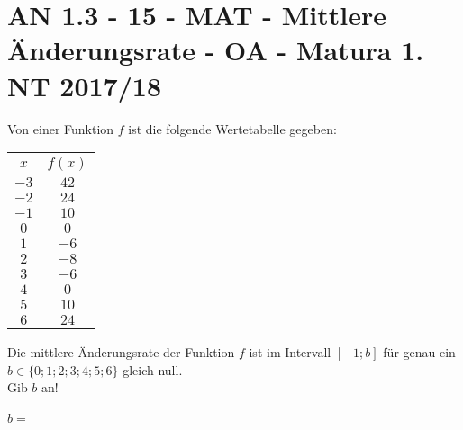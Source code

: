 \section{AN 1.3 - 15 - MAT - Mittlere Änderungsrate - OA - Matura 1. NT 2017/18}

\begin{beispiel}[AN 1.3]{1}
Von einer Funktion $f$ ist die folgende Wertetabelle gegeben: 
\begin{center}
	\begin{tabular}{|c|c|}\hline
	\cellcolor[gray]{0.9}$x$&\cellcolor[gray]{0.9}$f(x)$\\ \hline
	$-3$&$42$\\ \hline
	$-2$&$24$\\ \hline
	$-1$&$10$\\ \hline
	$0$&$0$\\ \hline
	$1$&$-6$\\ \hline
	$2$&$-8$\\ \hline
	$3$&$-6$\\ \hline
	$4$&$0$\\ \hline
	$5$&$10$\\ \hline
	$6$&$24$\\ \hline
	\end{tabular}
\end{center}

Die mittlere Änderungsrate der Funktion $f$ ist im Intervall $[-1;b]$ für genau ein $b\in\{0; 1; 2; 3; 4; 5; 6\}$ gleich null.\\
Gib $b$ an!\leer

$b=$\,
\end{beispiel}